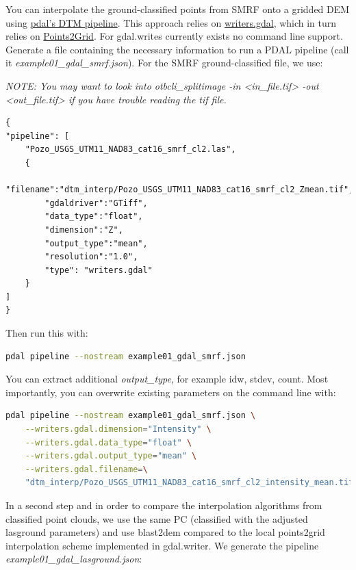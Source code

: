 \documentclass[a4paperpaper,,tablecaptionabove]{scrartcl}
\begin{document}
You can interpolate the ground-classified points from SMRF onto a
gridded DEM using
\href{https://pdal.io/workshop/exercises/analysis/dtm/dtm.html}{pdal's
DTM pipeline}. This approach relies on
\href{https://pdal.io/stages/writers.gdal.html\#writers-gdal}{writers.gdal},
which in turn relies on
\href{https://opentopography.org/otsoftware/points2grid}{Points2Grid}.
For gdal.writes currently exists no command line support. Generate a
file containing the necessary information to run a PDAL pipeline (call
it \emph{example01\_gdal\_smrf.json}). For the SMRF ground-classified
file, we use:

\emph{NOTE: You may want to look into otbcli\_splitimage -in
\textless{}in\_file.tif\textgreater{} -out
\textless{}out\_file.tif\textgreater{} if you have trouble reading the
tif file.}

\begin{lstlisting}
{
"pipeline": [
    "Pozo_USGS_UTM11_NAD83_cat16_smrf_cl2.las",
    {
        "filename":"dtm_interp/Pozo_USGS_UTM11_NAD83_cat16_smrf_cl2_Zmean.tif",
        "gdaldriver":"GTiff",
        "data_type":"float",
        "dimension":"Z",
        "output_type":"mean",
        "resolution":"1.0",
        "type": "writers.gdal"
    }
]
}
\end{lstlisting}

Then run this with:

\begin{lstlisting}[language=bash]
pdal pipeline --nostream example01_gdal_smrf.json
\end{lstlisting}

You can extract additional \emph{output\_type}, for example idw, stdev,
count. Most importantly, you can overwrite existing parameters on the
command line with:

\begin{lstlisting}[language=bash]
pdal pipeline --nostream example01_gdal_smrf.json \
    --writers.gdal.dimension="Intensity" \
    --writers.gdal.data_type="float" \
    --writers.gdal.output_type="mean" \
    --writers.gdal.filename=\
    "dtm_interp/Pozo_USGS_UTM11_NAD83_cat16_smrf_cl2_intensity_mean.tif"
\end{lstlisting}

In a second step and in order to compare the interpolation algorithms
from classified point clouds, we use the same PC (classified with the
adjusted lasground parameters) and use blast2dem compared to the local
points2grid interpolation scheme implemented in gdal.writer. We generate
the pipeline \emph{example01\_gdal\_lasground.json}:
\end{document}

